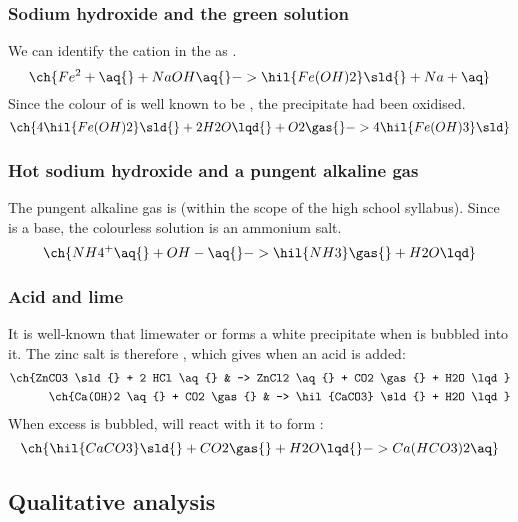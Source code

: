 \subsubsection{Sodium hydroxide and the green solution}
We can identify the cation in the  as .
\begin{equation*}
	\ch{Fe^2+ \aq{} + NaOH \aq{} -> \hil{Fe(OH)2} \sld{} + Na+ \aq} \\
\end{equation*}
Since the colour of  is well known to be ,
the precipitate had been oxidised.
\begin{equation*}
	\ch{4 \hil{Fe(OH)2} \sld{} + 2 H2O \lqd{} + O2 \gas{} -> 4 \hil{Fe(OH)3} \sld}
\end{equation*}

\subsubsection{Hot sodium hydroxide and a pungent alkaline gas}
The pungent alkaline gas is  (within the scope of the high school
syllabus). Since  is a base, the colourless solution is an ammonium
salt.
\begin{equation*}
	\ch{NH4^+ \aq{} + OH- \aq{} -> \hil{NH3} \gas{} + H2O \lqd}
\end{equation*}

\subsubsection{Acid and lime}
It is well-known that limewater or  forms a white precipitate when
 is bubbled into it. The zinc salt is therefore , which
gives  when an acid is added:
\begin{align*}
	\ch{ZnCO3 \sld{} + 2 HCl \aq{} & -> ZnCl2 \aq{} + CO2 \gas{} + H2O \lqd} \\
	\ch{Ca(OH)2 \aq{} + CO2 \gas{} & -> \hil{CaCO3} \sld{} + H2O \lqd}
\end{align*}
When excess  is bubbled,  will react with it to form
:
\begin{equation*}
	\ch{\hil{CaCO3} \sld{} + CO2 \gas{} + H2O \lqd{} -> Ca(HCO3)2 \aq}
\end{equation*}

\subsection{Qualitative analysis}
